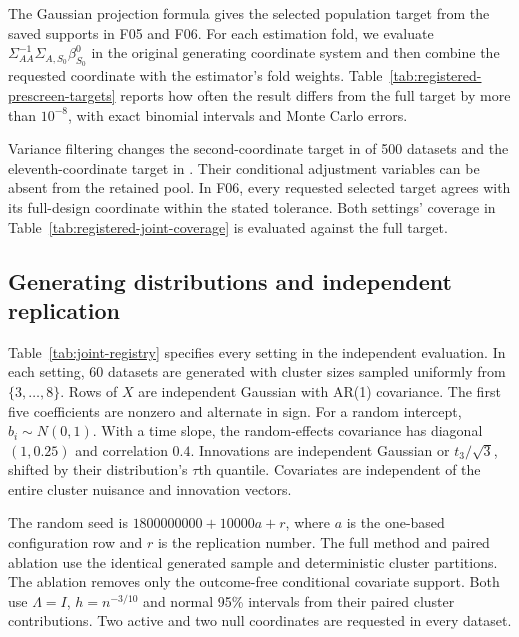 The Gaussian projection formula gives the selected population target
from the saved supports in F05 and F06. For each estimation fold,
we evaluate $\Sigma_{AA}^{-1}\Sigma_{A,S_0}\beta^0_{S_0}$ in the
original generating coordinate system and then combine the requested
coordinate with the estimator's fold weights.
Table~\ref{tab:registered-prescreen-targets} reports how often the
result differs from the full target by more than $10^{-8}$, with
exact binomial intervals and Monte Carlo errors.

Variance filtering changes the second-coordinate target in
\VarianceFilterSecondShifted{} of 500 datasets and the
eleventh-coordinate target in \VarianceFilterEleventhShifted{}.
Their conditional adjustment variables can be absent from the
retained pool. In F06, every requested selected target agrees with
its full-design coordinate within the stated tolerance. Both settings'
coverage in Table~\ref{tab:registered-joint-coverage} is evaluated
against the full target.



\subsection{Generating distributions and independent replication}

Table~\ref{tab:joint-registry} specifies every setting in the independent
evaluation. In each setting, 60 datasets are generated with cluster
sizes sampled uniformly from $\{3,\ldots,8\}$. Rows of $X$ are
independent Gaussian with AR(1) covariance. The first five
coefficients are nonzero and alternate in sign. For a random
intercept, $b_i\sim N(0,1)$. With a time slope, the random-effects
covariance has diagonal $(1,0.25)$ and correlation $0.4$.
Innovations are independent Gaussian or $t_3/\sqrt3$, shifted by
their distribution's $\tau$th quantile. Covariates are independent
of the entire cluster nuisance and innovation vectors.

The random seed is $1800000000+10000a+r$, where $a$ is the
one-based configuration row and $r$ is the replication number.
The full method and paired ablation use the identical generated
sample and deterministic cluster partitions. The ablation removes
only the outcome-free conditional covariate support. Both use
$\Lambda=I$, $h=n^{-3/10}$ and normal 95\% intervals from their
paired cluster contributions. Two active and two null coordinates
are requested in every dataset.



